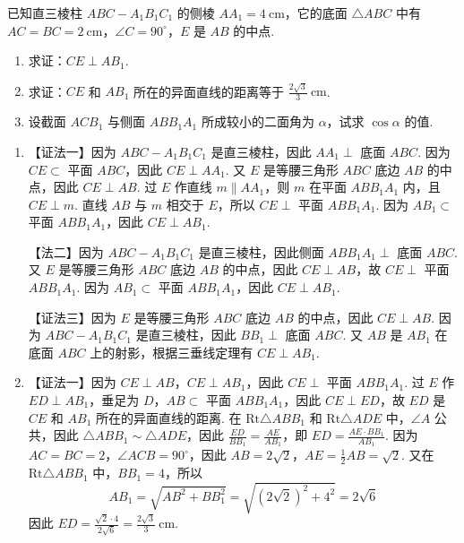 \begin{problem}

已知直三棱柱 \(ABC-A_{1}B_{1}C_{1}\) 的侧棱 \(AA_{1}=4\mathrm{~cm}\)，它的底面 \(\triangle ABC\) 中有 \(AC=BC=2\mathrm{~cm}\)，\(\angle C=90^{\circ}\)，\(E\) 是 \(AB\) 的中点.

\begin{enumerate}
\item 求证：\(CE\perp AB_{1}\).
\item 求证：\(CE\) 和 \(AB_{1}\) 所在的异面直线的距离等于 \(\frac{2\sqrt{3}}{3}\mathrm{~cm}\).
\item 设截面 \(ACB_{1}\) 与侧面 \(ABB_{1}A_{1}\) 所成较小的二面角为 \(\alpha\)，试求 \(\cos\alpha\) 的值.
\end{enumerate}

\begin{solution}
\begin{enumerate}
\item 【证法一】因为 \(ABC-A_{1}B_{1}C_{1}\) 是直三棱柱，因此 \(AA_{1}\perp\) 底面 \(ABC\). 因为 \(CE\subset\) 平面 \(ABC\)，因此 \(CE\perp AA_{1}\). 又 \(E\) 是等腰三角形 \(ABC\) 底边 \(AB\) 的中点，因此 \(CE\perp AB\). 过 \(E\) 作直线 \(m\parallel AA_{1}\)，则 \(m\) 在平面 \(ABB_{1}A_{1}\) 内，且 \(CE\perp m\). 直线 \(AB\) 与 \(m\) 相交于 \(E\)，所以 \(CE\perp\) 平面 \(ABB_{1}A_{1}\). 因为 \(AB_{1}\subset\) 平面 \(ABB_{1}A_{1}\)，因此 \(CE\perp AB_{1}\).

【法二】因为 \(ABC-A_{1}B_{1}C_{1}\) 是直三棱柱，因此侧面 \(ABB_{1}A_{1}\perp\) 底面 \(ABC\). 又 \(E\) 是等腰三角形 \(ABC\) 底边 \(AB\) 的中点，因此 \(CE\perp AB\)，故 \(CE\perp\) 平面 \(ABB_{1}A_{1}\). 因为 \(AB_{1}\subset\) 平面 \(ABB_{1}A_{1}\)，因此 \(CE\perp AB_{1}\).

【证法三】因为 \(E\) 是等腰三角形 \(ABC\) 底边 \(AB\) 的中点，因此 \(CE\perp AB\). 因为 \(ABC-A_{1}B_{1}C_{1}\) 是直三棱柱，因此 \(BB_{1}\perp\) 底面 \(ABC\). 又 \(AB\) 是 \(AB_{1}\) 在底面 \(ABC\) 上的射影，根据三垂线定理有 \(CE\perp AB_{1}\).

\item 【证法一】因为 \(CE\perp AB\)，\(CE\perp AB_{1}\)，因此 \(CE\perp\) 平面 \(ABB_{1}A_{1}\). 过 \(E\) 作 \(ED\perp AB_{1}\)，垂足为 \(D\)，\(AB\subset\) 平面 \(ABB_{1}A_{1}\)，因此 \(CE\perp ED\)，故 \(ED\) 是 \(CE\) 和 \(AB_{1}\) 所在的异面直线的距离. 在 \(\mathrm{Rt}\triangle ABB_{1}\) 和 \(\mathrm{Rt}\triangle ADE\) 中，\(\angle A\) 公共，因此 \(\triangle ABB_{1}\sim \triangle ADE\)，因此 \(\frac{ED}{BB_{1}}=\frac{AE}{AB_{1}}\)，即 \(ED=\frac{AE\cdot BB_{1}}{AB_{1}}\). 因为 \(AC=BC=2\)，\(\angle ACB=90^{\circ}\)，因此 \(AB=2\sqrt{2}\)，\(AE=\frac{1}{2}AB=\sqrt{2}\). 又在 \(\mathrm{Rt}\triangle ABB_{1}\) 中，\(BB_{1}=4\)，所以
\[
AB_{1}=\sqrt{AB^{2}+BB_{1}^{2}}=\sqrt{(2\sqrt{2})^{2}+4^{2}}=2\sqrt{6}
\]
因此
\(ED=\frac{\sqrt{2}\cdot4}{2\sqrt{6}}=\frac{2\sqrt{3}}{3}\mathrm{~cm}\).


\end{enumerate}
\end{solution}
\end{problem}
